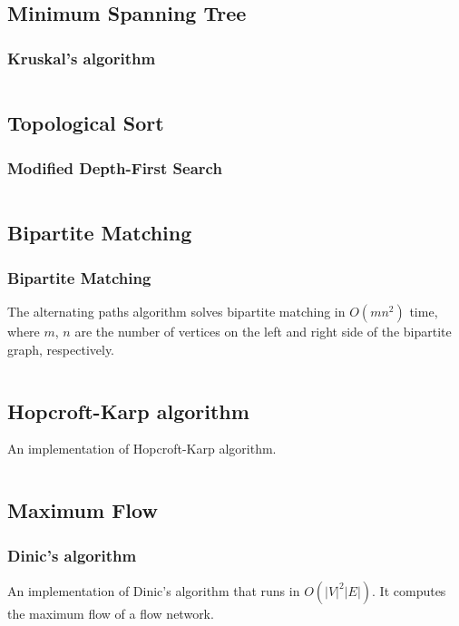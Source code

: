 \documentclass[9pt,a4paper,twocolumn,landscape,oneside]{amsart}
\newcommand{\code}[1]{\inputminted{cpp}{_code/#1}}
\begin{document}
    \subsection{Minimum Spanning Tree}
        \subsubsection{Kruskal's algorithm}
            \code{graph/kruskals_mst.cpp}

    \subsection{Topological Sort}
        \subsubsection{Modified Depth-First Search}
            \code{graph/tsort.cpp}

    \subsection{Bipartite Matching}

        \subsubsection{Bipartite Matching}
            The alternating paths algorithm solves bipartite matching in $O(mn^2)$
            time, where $m$, $n$ are the number of vertices on the left and right
            side of the bipartite graph, respectively.
            \code{graph/bipartite_matching.cpp}

        \subsection{Hopcroft-Karp algorithm}
            An implementation of Hopcroft-Karp algorithm.
            \code{graph/hopcroft_karp.cpp}

    \subsection{Maximum Flow}
        \subsubsection{Dinic's algorithm}
            An implementation of Dinic's algorithm that runs in
            $O(|V|^2|E|)$. It computes the maximum flow of a flow network.
            \code{graph/dinic.cpp}
\end{document}
